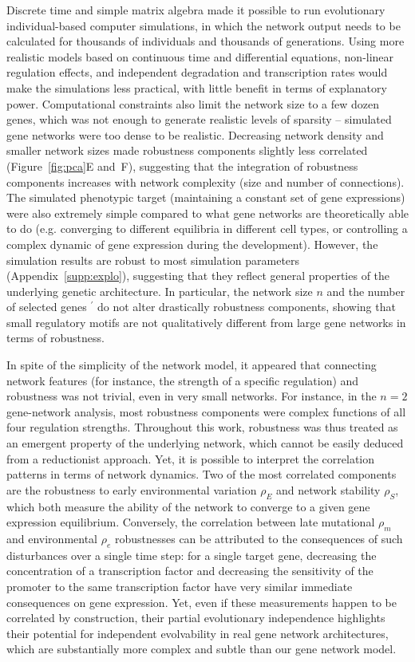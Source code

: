 \documentclass[10pt,a4paper]{article}
\newcommand{\stability}{{\rho_S}}
\newcommand{\earlyenv}{{\rho_E}}
\newcommand{\lateenv}{{\rho_e}}
\newcommand{\latemut}{{\rho_m}}
\newcommand{\SupMat}{Appendix~}
\begin{document}
Discrete time and simple matrix algebra made it possible to run evolutionary individual-based computer simulations, in which the network output needs to be calculated for thousands of individuals and thousands of generations. Using more realistic models based on continuous time and differential equations, non-linear regulation effects, and independent degradation and transcription rates would make the simulations less practical, with little benefit in terms of explanatory power. Computational constraints also limit the network size to a few dozen genes, which was not enough to generate realistic levels of sparsity -- simulated gene networks were too dense to be realistic. Decreasing network density and smaller network sizes made robustness components slightly less correlated (Figure~\ref{fig:pca}E and~F), suggesting that the integration of robustness components increases with network complexity (size and number of connections). The simulated phenotypic target (maintaining a constant set of gene expressions) were also extremely simple compared to what gene networks are theoretically able to do (e.g. converging to different equilibria in different cell types, or controlling a complex dynamic of gene expression during the development). However, the simulation results are robust to most simulation parameters (\SupMat \ref{supp:explo}), suggesting that they reflect general properties of the underlying genetic architecture. In particular, the network size $n$ and the number of selected genes $^\prime$ do not alter drastically robustness components, showing that small regulatory motifs are not qualitatively different from large gene networks in terms of robustness. 

In spite of the simplicity of the network model, it appeared that connecting network features (for instance, the strength of a specific regulation) and robustness was not trivial, even in very small networks. For instance, in the $n=2$ gene-network analysis, most robustness components were complex functions of all four regulation strengths. Throughout this work, robustness was thus treated as an emergent property of the underlying network, which cannot be easily deduced from a reductionist approach. Yet, it is possible to interpret the correlation patterns in terms of network dynamics. Two of the most correlated components are the robustness to early environmental variation $\earlyenv$ and network stability $\stability$, which both measure the ability of the network to converge to a given gene expression equilibrium. Conversely, the correlation between late mutational $\latemut$ and environmental $\lateenv$ robustnesses can be attributed to the consequences of such disturbances over a single time step: for a single target gene, decreasing the concentration of a transcription factor and decreasing the sensitivity of the promoter to the same transcription factor have very similar immediate consequences on gene expression. Yet, even if these measurements happen to be correlated by construction, their partial evolutionary independence highlights their potential for independent evolvability in real gene network architectures, which are substantially more complex and subtle than our gene network model. 
\end{document}
